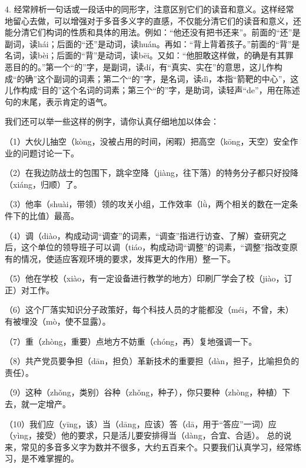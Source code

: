 4. 经常辨析一句话或一段话中的同形字，注意区别它们的读音和意义。这样经常地留心去做，可以增强对于多音多义字的直感，不仅能分清它们的读音和意义，还能分清它们构词的性质和具体的用法。例如：“他还没有把书还来”。前面的“还”是副词，读hái；后面的“还”是动词，读huán。再如：“背上背着孩子。”前面的“背”是名词，读bèi；后面的“背”是动词，读bēi。又如：“他胆敢这样做，的确是有其罪恶目的的。”第一个“的”字，是副词，读dí，有“真实、实在”的意思，这儿作构成“的确”这个副词的词素；第二个“的”字，是名词，读dì，本指“箭靶的中心”，这儿作构成“目的”这个名词的词素；第三个“的”字，是助词，读轻声“de”，用在陈述句的末尾，表示肯定的语气。

我们还可以举一些这样的例字，请你认真仔细地加以体会：

（1）大伙儿抽空（kòng，没被占用的时间，闲暇）把高空（kōng，天空）安全作业的问题讨论一下。

（2）在我边防战士的包围下，跳伞空降（jiàng，往下落）的特务分子都只好投降（xiáng，归顺）了。

（3）他率（shuài，带领）领的攻关小组，工作效率（lǜ，两个相关的数在一定条件下的比值）最高。
\newpage

（4）调（diào，构成动词“调查”的词素，“调查”指进行访查、了解）查研究之后，这个单位的领导班子可以调（tiáo，构成动词“调整”的词素，“调整”指改变原有的情况，使适应客观环境的要求，发挥更大的作用）整一下。

（5）他在学校（xiào，有一定设备进行教学的地方）印刷厂学会了校（jiào，订正）对工作。

（6）这个厂落实知识分子政策好，每个科技人员的才能都没（méi，不曾，未）有被埋没（mò，使不显露）。

（7）重（zhòng，重要）点地方不妨重（chóng，再）复地强调一下。

（8）共产党员要争担（dān，担负）革新技术的重要担（dàn，担子，比喻担负的责任）。

（9）这种（zhǒng，类别）谷种（zhǒng，种子），你只要种（zhòng，种植）下去，就一定增产。

（10）我们应（yīng，该）当（dāng，应该）答（dā，用于“答应”一词）应（yìng，接受）他的要求，只是活儿要安排得当（dàng，合宜、合适）。
总的说来，常见的多音多义字为数并不很多，大约五百来个。只要我们认真学习，经常练习，是不难掌握的。
\newpage